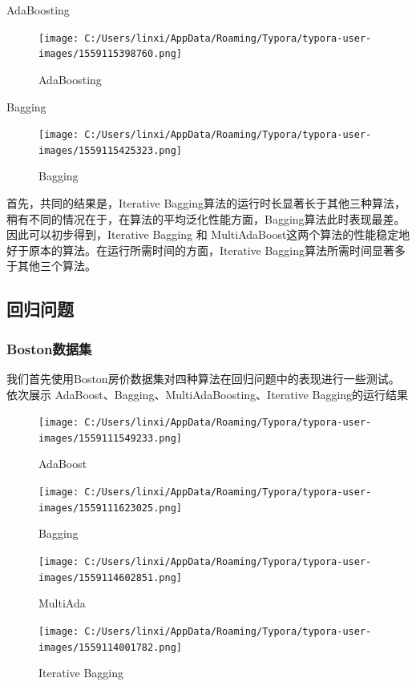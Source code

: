\documentclass[UTF8]{ctexart}
\begin{document}
AdaBoosting
\begin{figure}[htb]
	\centering
	\texttt{[image: C:/Users/linxi/AppData/Roaming/Typora/typora-user-images/1559115398760.png]}
	\caption{AdaBoosting}
\end{figure}

Bagging

\begin{figure}[htb]
	\centering
	\texttt{[image: C:/Users/linxi/AppData/Roaming/Typora/typora-user-images/1559115425323.png]}
	\caption{Bagging}
\end{figure}

首先，共同的结果是，Iterative Bagging算法的运行时长显著长于其他三种算法，稍有不同的情况在于，在算法的平均泛化性能方面，Bagging算法此时表现最差。因此可以初步得到，Iterative Bagging 和 MultiAdaBoost这两个算法的性能稳定地好于原本的算法。在运行所需时间的方面，Iterative Bagging算法所需时间显著多于其他三个算法。

\newpage
\subsection{回归问题}
\subsubsection{Boston数据集}
我们首先使用Boston房价数据集对四种算法在回归问题中的表现进行一些测试。
依次展示 AdaBoost、Bagging、MultiAdaBoosting、Iterative Bagging的运行结果
\begin{figure}[htb]
	\centering
	\texttt{[image: C:/Users/linxi/AppData/Roaming/Typora/typora-user-images/1559111549233.png]}
	\caption{AdaBoost}
\end{figure}

\begin{figure}[htb]
	\centering
	\texttt{[image: C:/Users/linxi/AppData/Roaming/Typora/typora-user-images/1559111623025.png]}
	\caption{Bagging}
\end{figure}

\begin{figure}[htb]
	\centering
	\texttt{[image: C:/Users/linxi/AppData/Roaming/Typora/typora-user-images/1559114602851.png]}
	\caption{MultiAda}
\end{figure}

\begin{figure}[htb]
	\centering
	\texttt{[image: C:/Users/linxi/AppData/Roaming/Typora/typora-user-images/1559114001782.png]}
	\caption{Iterative Bagging}
\end{figure}
\end{document}
